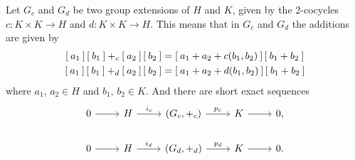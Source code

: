 Let $G_c$ and $G_d$ be two group extensions of $H$ and $K$, given by the 2-cocycles $c: K \times K \rightarrow H$ and $d:K \times K \rightarrow H$.
This means that in $G_c$ and $G_d$ the additions are given by
\begin{align}
  \label{eq:groupAdditionGroups}
  \begin{split}
    \left[\: a_1 \:\right]\left[\: b_1 \:\right] +_c \left[\: a_2 \:\right]\left[\: b_2 \:\right]
      &=
      \left[\: a_1 + a_2 + c(b_1, b_2) \:\right]\left[\: b_1 + b_2 \:\right] \\
    \left[\: a_1 \:\right]\left[\: b_1 \:\right] +_d \left[\: a_2 \:\right]\left[\: b_2 \:\right]
      &=
      \left[\: a_1 + a_2 + d(b_1, b_2) \:\right]\left[\: b_1 + b_2 \:\right]
  \end{split}
\end{align}
where $a_1$, $a_2 \in H$ and $b_1$, $b_2 \in K$. And there are short exact sequences
\begin{equation*}
  \begin{tikzcd}
    0 \ar[r] & H \ar[r,"i_c"] &  (G_c,+_c)  \ar[r, "p_c"] & K \ar[r] & 0, \\
    0 \ar[r] & H \ar[r,"i_d"] &  (G_d,+_d)  \ar[r, "p_d"] & K \ar[r] & 0.
  \end{tikzcd}
\end{equation*}


%
%

